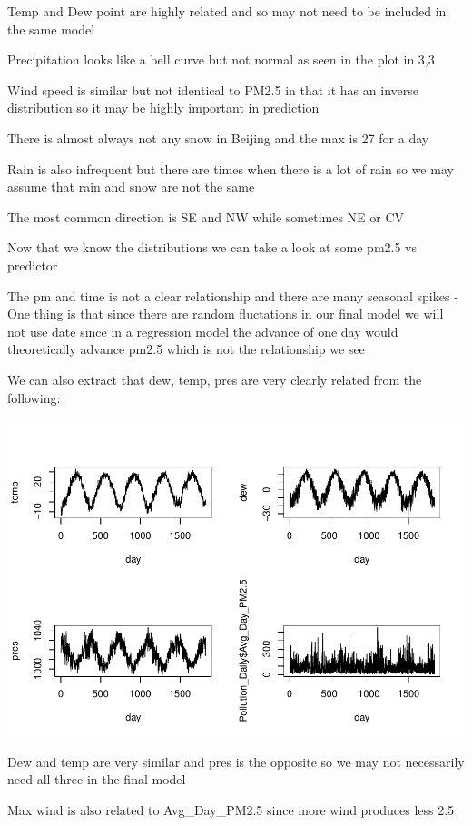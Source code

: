 \documentclass[
]{article}
\begin{document}
Temp and Dew point are highly related and so may not need to be included
in the same model

Precipitation looks like a bell curve but not normal as seen in the plot
in 3,3

Wind speed is similar but not identical to PM2.5 in that it has an
inverse distribution so it may be highly important in prediction

There is almost always not any snow in Beijing and the max is 27 for a
day

Rain is also infrequent but there are times when there is a lot of rain
so we may assume that rain and snow are not the same

The most common direction is SE and NW while sometimes NE or CV

Now that we know the distributions we can take a look at some pm2.5 vs
predictor

The pm and time is not a clear relationship and there are many seasonal
spikes - One thing is that since there are random fluctations in our
final model we will not use date since in a regression model the advance
of one day would theoretically advance pm2.5 which is not the
relationship we see

We can also extract that dew, temp, pres are very clearly related from
the following:

\includegraphics[height=0.9\textheight]{Final_Project_2_files/figure-latex/unnamed-chunk-5-1}

Dew and temp are very similar and pres is the opposite so we may not
necessarily need all three in the final model

Max wind is also related to Avg\_Day\_PM2.5 since more wind produces
less 2.5
\end{document}
